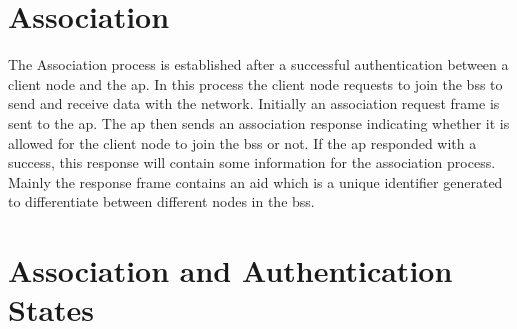 \section{Association}
\label{sec:association}
The Association process is established after a successful authentication between a client node and the \ac{ap}.
In this process the client node requests to join the \ac{bss} to send and receive data with the network. Initially
an association request frame is sent to the \ac{ap}. The \ac{ap} then sends an association response indicating whether
it is allowed for the client node to join the \ac{bss} or not. If the \ac{ap} responded with a success, this response
will contain some information for the association process. Mainly the response frame contains an \ac{aid} which is a unique
identifier generated to differentiate between different nodes in the \ac{bss}.\cite{cwsp-205_2016}


\section{Association and Authentication States}
\label{sec:association_authentication_states}
